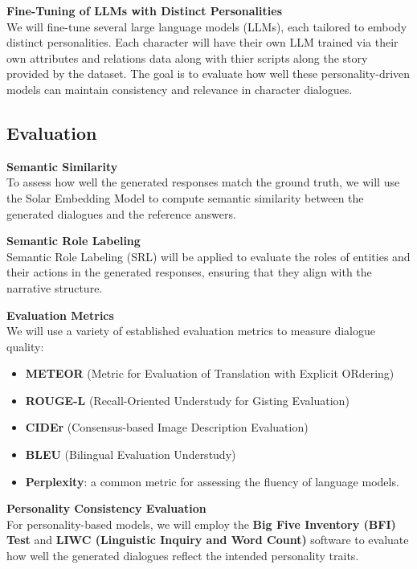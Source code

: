 \documentclass{article}
\begin{document}
\textbf{Fine-Tuning of LLMs with Distinct Personalities} \\
We will fine-tune several large language models (LLMs), each tailored to embody distinct personalities. Each character will have their own LLM trained via their own attributes and relations data along with thier scripts along the story provided by the dataset. The goal is to evaluate how well these personality-driven models can maintain consistency and relevance in character dialogues.

\subsection{Evaluation}

\textbf{Semantic Similarity} \\
To assess how well the generated responses match the ground truth, we will use the Solar Embedding Model to compute semantic similarity between the generated dialogues and the reference answers.

\textbf{Semantic Role Labeling} \\
Semantic Role Labeling (SRL) will be applied to evaluate the roles of entities and their actions in the generated responses, ensuring that they align with the narrative structure.

\textbf{Evaluation Metrics} \\
We will use a variety of established evaluation metrics to measure dialogue quality:
\begin{itemize}
    \item \textbf{METEOR} (Metric for Evaluation of Translation with Explicit ORdering)
    \item \textbf{ROUGE-L} (Recall-Oriented Understudy for Gisting Evaluation)
    \item \textbf{CIDEr} (Consensus-based Image Description Evaluation)
    \item \textbf{BLEU} (Bilingual Evaluation Understudy)
    \item \textbf{Perplexity}: a common metric for assessing the fluency of language models.
\end{itemize}

\textbf{Personality Consistency Evaluation} \\
For personality-based models, we will employ the \textbf{Big Five Inventory (BFI) Test} and \textbf{LIWC (Linguistic Inquiry and Word Count)} software to evaluate how well the generated dialogues reflect the intended personality traits.
\end{document}
